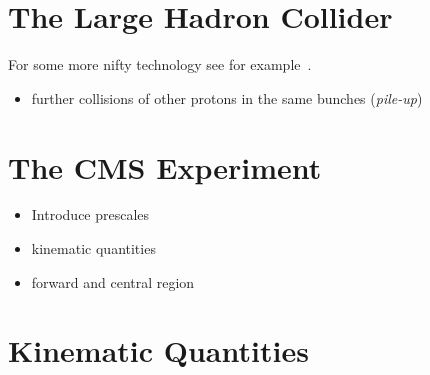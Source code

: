 
\section{The Large Hadron Collider}
For some more nifty technology see for example~\cite{bib:TechnikDerEnterprise}.

\begin{itemize}
\item further collisions of other protons in the same bunches (\textit{pile-up})
\end{itemize}
\section{The CMS Experiment}
\begin{itemize}
\item Introduce prescales
\item kinematic quantities
\item forward and central region
\end{itemize}


\section{Kinematic Quantities}